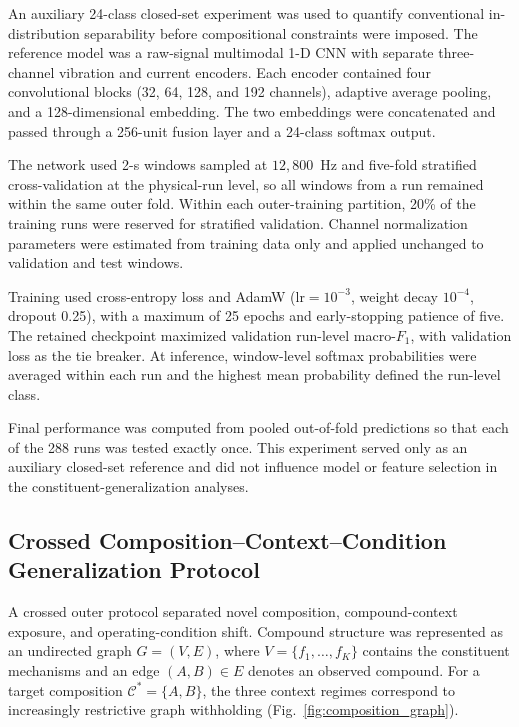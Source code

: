 \documentclass{ieeeaccess}
\begin{document}
An auxiliary 24-class closed-set experiment was used to quantify conventional
in-distribution separability before compositional constraints were imposed.
The reference model was a raw-signal multimodal 1-D CNN with separate
three-channel vibration and current encoders. Each encoder contained four
convolutional blocks (32, 64, 128, and 192 channels), adaptive average pooling,
and a 128-dimensional embedding. The two embeddings were concatenated and
passed through a 256-unit fusion layer and a 24-class softmax output.

The network used 2-s windows sampled at $12{,}800$~Hz and five-fold stratified
cross-validation at the physical-run level, so all windows from a run remained
within the same outer fold. Within each outer-training partition, 20\% of the
training runs were reserved for stratified validation. Channel normalization
parameters were estimated from training data only and applied unchanged to
validation and test windows.

Training used cross-entropy loss and AdamW
($\mathrm{lr}=10^{-3}$, weight decay $10^{-4}$, dropout 0.25), with a maximum
of 25 epochs and early-stopping patience of five. The retained checkpoint
maximized validation run-level macro-$F_1$, with validation loss as the tie
breaker. At inference, window-level softmax probabilities were averaged within
each run and the highest mean probability defined the run-level class.

Final performance was computed from pooled out-of-fold predictions so that
each of the 288 runs was tested exactly once. This experiment served only as
an auxiliary closed-set reference and did not influence model or feature
selection in the constituent-generalization analyses.

\subsection{Crossed Composition--Context--Condition Generalization Protocol}
\label{subsec:crossed_protocol}

A crossed outer protocol separated novel composition, compound-context
exposure, and operating-condition shift. Compound structure was represented
as an undirected graph $G=(V,E)$, where
$V=\{f_1,\ldots,f_K\}$ contains the constituent mechanisms and an edge
$(A,B)\in E$ denotes an observed compound. For a target composition
$\mathcal{C}^{*}=\{A,B\}$, the three context regimes correspond to
increasingly restrictive graph withholding (Fig.~\ref{fig:composition_graph}).
\end{document}
